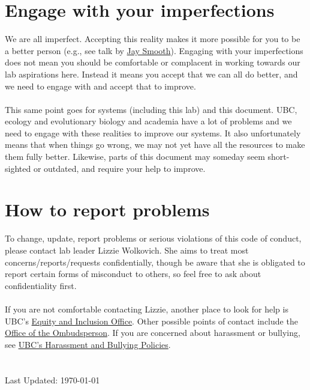 \documentclass[11pt,a4paper,oneside]{article}
\begin{document}
\section{Engage with your imperfections}

We are all imperfect. %
 Accepting this reality makes it more possible for you to be a better person (e.g., see talk by \href{https://www.youtube.com/watch?v=MbdxeFcQtaU}{Jay Smooth}). Engaging with your imperfections does not mean you should be comfortable or complacent in working towards our lab aspirations here. Instead it means you accept that we can all do better, and we need to engage with and accept that to improve. \\
\\
\noindent
This same point goes for systems (including this lab) and this document. UBC, ecology and evolutionary biology and academia have a lot of problems and we need to engage with these realities to improve our systems. It also unfortunately means that when things go wrong, we may not yet have all the resources to make them fully better. Likewise, parts of this document may someday seem short-sighted or outdated, and require your help to improve.

\section*{How to report problems}

To change, update, report problems or serious violations of this code of conduct, please contact lab leader Lizzie Wolkovich. She aims to treat most concerns/reports/requests  confidentially, though be aware that she is obligated to report certain forms of misconduct to others, so feel free to ask about confidentiality first. \\
\\
\noindent
If you are not comfortable contacting Lizzie, another place to look for help is UBC’s \href{https://equity.ubc.ca/}{Equity and Inclusion Office}. Other possible points of contact include the \href{https://ombudsoffice.ubc.ca/}{Office of the Ombudsperson}. If you are concerned about harassment or bullying, see \href{https://bullyingandharassment.ubc.ca/resources/}{UBC’s Harassment and Bullying Policies}.\\
\\
\\
Last Updated: \today %
\end{document}
